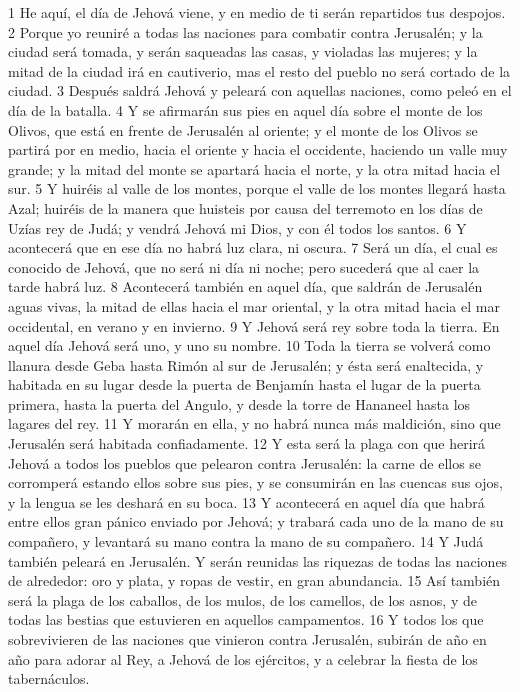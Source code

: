 1 He aquí, el día de Jehová viene, y en medio de ti serán repartidos tus despojos.
2 Porque yo reuniré a todas las naciones para combatir contra Jerusalén; y la ciudad será tomada, y serán saqueadas las casas, y violadas las mujeres; y la mitad de la ciudad irá en cautiverio, mas el resto del pueblo no será cortado de la ciudad.
3 Después saldrá Jehová y peleará con aquellas naciones, como peleó en el día de la batalla.
4 Y se afirmarán sus pies en aquel día sobre el monte de los Olivos, que está en frente de Jerusalén al oriente; y el monte de los Olivos se partirá por en medio, hacia el oriente y hacia el occidente, haciendo un valle muy grande; y la mitad del monte se apartará hacia el norte, y la otra mitad hacia el sur.
5 Y huiréis al valle de los montes, porque el valle de los montes llegará hasta Azal; huiréis de la manera que huisteis por causa del terremoto en los días de Uzías rey de Judá; y vendrá Jehová mi Dios, y con él todos los santos.
6 Y acontecerá que en ese día no habrá luz clara, ni oscura.
7 Será un día, el cual es conocido de Jehová, que no será ni día ni noche; pero sucederá que al caer la tarde habrá luz.
8 Acontecerá también en aquel día, que saldrán de Jerusalén aguas vivas, la mitad de ellas hacia el mar oriental, y la otra mitad hacia el mar occidental, en verano y en invierno.
9 Y Jehová será rey sobre toda la tierra. En aquel día Jehová será uno, y uno su nombre.
10 Toda la tierra se volverá como llanura desde Geba hasta Rimón al sur de Jerusalén; y ésta será enaltecida, y habitada en su lugar desde la puerta de Benjamín hasta el lugar de la puerta primera, hasta la puerta del Angulo, y desde la torre de Hananeel hasta los lagares del rey.
11 Y morarán en ella, y no habrá nunca más maldición, sino que Jerusalén será habitada confiadamente.
12 Y esta será la plaga con que herirá Jehová a todos los pueblos que pelearon contra Jerusalén: la carne de ellos se corromperá estando ellos sobre sus pies, y se consumirán en las cuencas sus ojos, y la lengua se les deshará en su boca.
13 Y acontecerá en aquel día que habrá entre ellos gran pánico enviado por Jehová; y trabará cada uno de la mano de su compañero, y levantará su mano contra la mano de su compañero.
14 Y Judá también peleará en Jerusalén. Y serán reunidas las riquezas de todas las naciones de alrededor: oro y plata, y ropas de vestir, en gran abundancia.
15 Así también será la plaga de los caballos, de los mulos, de los camellos, de los asnos, y de todas las bestias que estuvieren en aquellos campamentos.
16 Y todos los que sobrevivieren de las naciones que vinieron contra Jerusalén, subirán de año en año para adorar al Rey, a Jehová de los ejércitos, y a celebrar la fiesta de los tabernáculos. 
